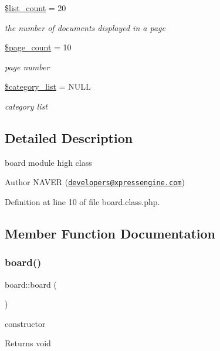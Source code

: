\begin{DoxyCompactItemize}
\hyperlink{classboard_ab66c6932a082c110ebd921c0be8d6788}{\$list\+\_\+count} = 20
\begin{DoxyCompactList}\small\item\em the number of documents displayed in a page \end{DoxyCompactList}\item 
\hyperlink{classboard_ab5d2d3925f753039483da2c65076122b}{\$page\+\_\+count} = 10
\begin{DoxyCompactList}\small\item\em page number \end{DoxyCompactList}\item 
\hyperlink{classboard_aee8ebe65314796fea517f8f7875a4b8f}{\$category\+\_\+list} = N\+U\+LL
\begin{DoxyCompactList}\small\item\em category list \end{DoxyCompactList}\end{DoxyCompactItemize}


\subsection{Detailed Description}
board module high class 

\begin{DoxyAuthor}{Author}
N\+A\+V\+ER (\href{mailto:developers@xpressengine.com}{\tt developers@xpressengine.\+com}) 
\end{DoxyAuthor}


Definition at line 10 of file board.\+class.\+php.



\subsection{Member Function Documentation}
\mbox{\label{classboard_a2a97f34e7c9ed8ace6a2508bb2c6e2a2}} 
\subsubsection{\texorpdfstring{board()}{board()}}
{\footnotesize\ttfamily board\+::board (\begin{DoxyParamCaption}{ }\end{DoxyParamCaption})}

constructor

\begin{DoxyReturn}{Returns}
void 
\end{DoxyReturn}


